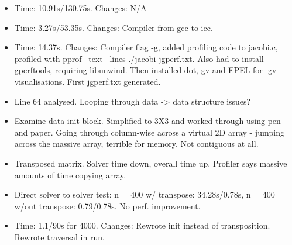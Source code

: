 \documentclass{article}
\begin{document}
\begin{itemize}
\item Time: 10.91s/130.75s. Changes: N/A
\item Time: 3.27s/53.35s. Changes: Compiler from gcc to icc.
\item Time: 14.37s. Changes: Compiler flag -g, added profiling code to jacobi.c, profiled with pprof --text --lines ./jacobi jgperf.txt. Also had to install gperftools, requiring libunwind. Then installed dot, gv and EPEL for -gv visualisations. First jgperf.txt generated.
\item Line 64 analysed. Looping through data -> data structure issues?
\item Examine data init block. Simplified to 3X3 and worked through using pen and paper. Going through column-wise across a virtual 2D array - jumping across the massive array, terrible for memory. Not contiguous at all.
\item Transposed matrix. Solver time down, overall time up. Profiler says massive amounts of time copying array.
\item Direct solver to solver test: n = 400 w/ transpose: 34.28s/0.78s, n = 400 w/out transpose: 0.79/0.78s. No perf. improvement.
\item Time: 1.1/90s for 4000. Changes: Rewrote init instead of transposition. Rewrote traversal in run.
\end{itemize}
\end{document}
